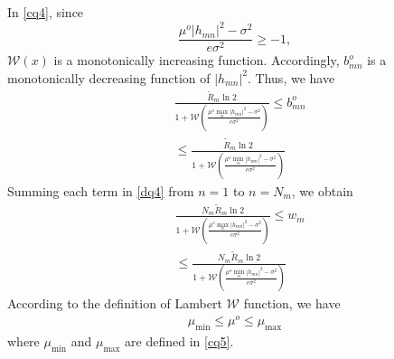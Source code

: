 \documentclass[journal]{IEEEtran}
\begin{document}
In \eqref{cq4}, since
\begin{equation}
\frac{\mu^o\left|h_{mn}\right|^2 - \sigma^2}{e\sigma^2}\geq-1,
\end{equation}
$\mathcal{W}\left(x\right)$ is a monotonically increasing function. Accordingly, $b_{mn}^o$ is a monotonically decreasing function of $\left|h_{mn}\right|^2$. Thus, we have
\begin{align}\label{dq4}
&\frac{\tilde{R}_m\ln2}{1 + \mathcal{W}\left(\frac{\mu^o\max_n\left|h_{mn}\right|^2 - \sigma^2}{e\sigma^2}\right)}\leq b_{mn}^o \nonumber\\ &\leq  \frac{\tilde{R}_m\ln2}{1 + \mathcal{W}\left(\frac{\mu^o\min_n\left|h_{mn}\right|^2 - \sigma^2}{e\sigma^2}\right)}
\end{align}
Summing each term in \eqref{dq4} from $n=1$ to $n= N_m$, we obtain
\begin{align}
&\frac{N_m\tilde{R}_m\ln2}{1 + \mathcal{W}\left(\frac{\mu^o\max_n\left|h_{mn}\right|^2 - \sigma^2}{e\sigma^2}\right)}\leq w_{m} \nonumber\\ &\leq  \frac{N_m\tilde{R}_m\ln2}{1 + \mathcal{W}\left(\frac{\mu^o\min_n\left|h_{mn}\right|^2 - \sigma^2}{e\sigma^2}\right)}
\end{align}
According to the definition of Lambert $\mathcal{W}$ function, we have
\begin{align}
\mu_{\min} \leq \mu^o \leq \mu_{\max}
\end{align}
where $\mu_{\min}$ and $\mu_{\max}$ are defined in \eqref{cq5}.
\end{document}
